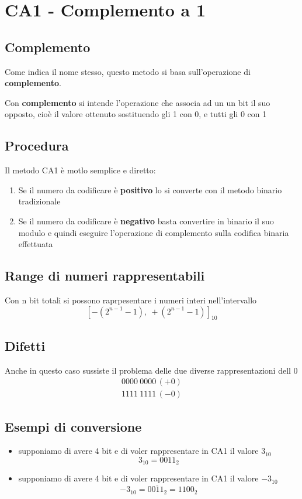 \section{CA1 - Complemento a 1}
\subsection{Complemento}
Come indica il nome stesso, questo metodo si basa sull'operazione di \textbf{complemento}.

Con \textbf{complemento} si intende l'operazione che associa ad un un bit il suo opposto, cioè il valore ottenuto sostituendo gli 1 con 0, e tutti gli 0 con 1

\subsection{Procedura}
Il metodo CA1 è motlo semplice e diretto:
\begin{enumerate}
    \item Se il numero da codificare è \textbf{positivo} lo si converte con il metodo binario tradizionale
    \item Se il numero da codificare è \textbf{negativo} basta convertire in binario il suo modulo e quindi eseguire l'operazione di complemento sulla codifica binaria effettuata
\end{enumerate}

\subsection{Range di numeri rappresentabili}
Con n bit totali si possono raprpesentare i numeri interi nell'intervallo
{\LARGE
$$
    [-(2^{n-1}-1),\ +(2^{n-1}-1)]_{10}
$$
}

\subsection{Difetti}
Anche in questo caso sussiste il problema delle due diverse rappresentazioni dell 0
{
    \Large
    \begin{gather*}
    0000\ 0000\, (+0) \\
    1111\ 1111\, (-0)
\end{gather*}}

\subsection{Esempi di conversione}
\begin{itemize}
    \item supponiamo di avere 4 bit e di voler rappresentare in CA1 il valore $3_{10}$
{\large
        \[
        3_{10} = 0011_2
    \]}

    \item supponiamo di avere 4 bit e di voler rappresentare in CA1 il valore $-3_{10}$
   {\large
     \[
        -3_{10} = \overline{0011_2} = 1100_2
    \]}
\end{itemize}

